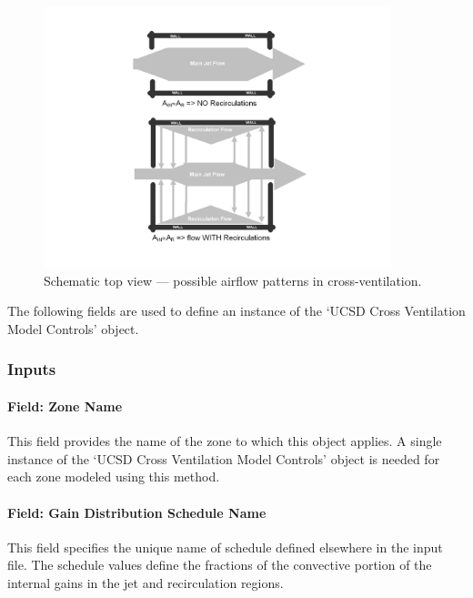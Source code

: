 \begin{figure}[hbtp] %
\centering
\includegraphics[width=0.9\textwidth, height=0.9\textheight, keepaspectratio=true]{media/image082.png}
\caption{Schematic top view --- possible airflow patterns in cross-ventilation. \protect \label{fig:schematic-top-view-possible-airflow-patterns}}
\end{figure}

The following fields are used to define an instance of the `UCSD Cross Ventilation Model Controls' object.

\subsubsection{Inputs}\label{inputs-9-018}

\paragraph{Field: Zone Name}\label{field-zone-name-5-004}

This field provides the name of the zone to which this object applies. A single instance of the `UCSD Cross Ventilation Model Controls' object is needed for each zone modeled using this method.

\paragraph{Field: Gain Distribution Schedule Name}\label{field-gain-distribution-schedule-name-1}

This field specifies the unique name of schedule defined elsewhere in the input file. The schedule values define the fractions of the convective portion of the internal gains in the jet and recirculation regions.

